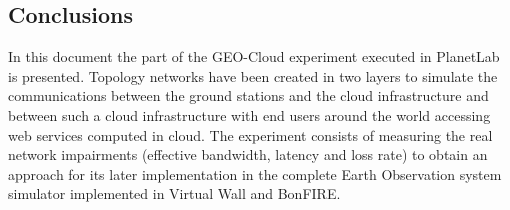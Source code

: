 \subsection{Conclusions}
In this document the part of the GEO-Cloud experiment executed in PlanetLab is presented. Topology networks have been created in two layers to simulate the communications between the ground stations and the cloud infrastructure and between such a cloud infrastructure with end users around the world accessing web services computed in cloud. The experiment consists of measuring the real network impairments (effective bandwidth, latency and loss rate) to obtain an approach for its later implementation in the complete Earth Observation system simulator implemented in Virtual Wall and BonFIRE. 
